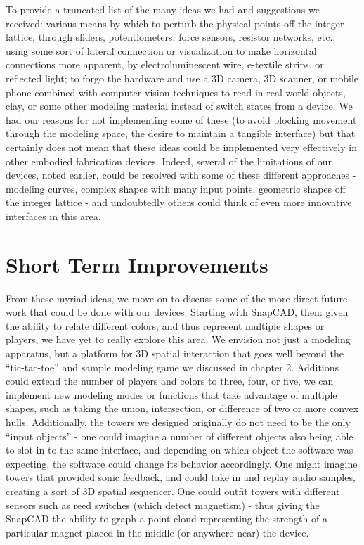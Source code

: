 To provide a truncated list of the many ideas we had and suggestions we
received: various means by which to perturb the physical points off the integer
lattice, through sliders, potentiometers, force sensors, resistor networks,
etc.; using some sort of lateral connection or visualization to make horizontal
connections more apparent, by electroluminescent wire, e-textile strips, or
reflected light; to forgo the hardware and use a 3D camera, 3D scanner, or
mobile phone combined with computer vision techniques to read in real-world
objects, clay, or some other modeling material instead of switch states from a
device. We had our reasons for not implementing some of these (to avoid blocking
movement through the modeling space, the desire to maintain a tangible
interface) but that certainly does not mean that these ideas could be
implemented very effectively in other embodied fabrication devices. Indeed,
several of the limitations of our devices, noted earlier, could be resolved with
some of these different approaches - modeling curves, complex shapes with many
input points, geometric shapes off the integer lattice - and undoubtedly others
could think of even more innovative interfaces in this area.

\section{Short Term Improvements}

From these myriad ideas, we move on to discuss some of the more direct future
work that could be done with our devices. Starting with SnapCAD, then: given the
ability to relate different colors, and thus represent multiple shapes or
players, we have yet to really explore this area. We envision not just a
modeling apparatus, but a platform for 3D spatial interaction that goes well
beyond the ``tic-tac-toe'' and sample modeling game we discussed in chapter 2.
Additions could extend the number of players and colors to three, four, or five,
we can implement new modeling modes or functions that take advantage of multiple
shapes, such as taking the union, intersection, or difference of two or more
convex hulls. Additionally, the towers we designed originally do not need to be
the only ``input objects'' - one could imagine a number of different objects
also being able to slot in to the same interface, and depending on which object
the software was expecting, the software could change its behavior accordingly.
One might imagine towers that provided sonic feedback, and could take in and
replay audio samples, creating a sort of 3D spatial sequencer. One could outfit
towers with different sensors such as reed switches (which detect magnetism) -
thus giving the SnapCAD the ability to graph a point cloud representing the
strength of a particular magnet placed in the middle (or anywhere near) the
device.

